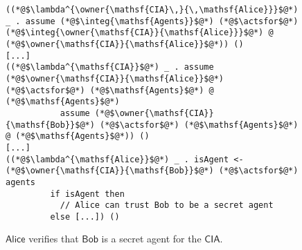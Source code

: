 \begin{figure}
\centering
\begin{lstlisting}
((*@$\lambda^{\owner{\mathsf{CIA}\,}{\,\mathsf{Alice}}}$@*) _ . assume (*@$\integ{\mathsf{Agents}}$@*) (*@$\actsfor$@*) (*@$\integ{\owner{\mathsf{CIA}}{\mathsf{Alice}}}$@*) @ (*@$\owner{\mathsf{CIA}}{\mathsf{Alice}}$@*)) ()
[...]
((*@$\lambda^{\mathsf{CIA}}$@*) _ . assume (*@$\owner{\mathsf{CIA}}{\mathsf{Alice}}$@*) (*@$\actsfor$@*) (*@$\mathsf{Agents}$@*) @ (*@$\mathsf{Agents}$@*)
           assume (*@$\owner{\mathsf{CIA}}{\mathsf{Bob}}$@*) (*@$\actsfor$@*) (*@$\mathsf{Agents}$@*) @ (*@$\mathsf{Agents}$@*)) ()
[...]
((*@$\lambda^{\mathsf{Alice}}$@*) _ . isAgent <- (*@$\owner{\mathsf{CIA}}{\mathsf{Bob}}$@*) (*@$\actsfor$@*) agents
         if isAgent then
           // Alice can trust Bob to be a secret agent
         else [...]) ()
\end{lstlisting}
\caption{$\mathsf{Alice}$ verifies that $\mathsf{Bob}$ is a secret agent for the $\mathsf{CIA}$.}
\label{fig:govt-alice-checks-bob}
\end{figure}